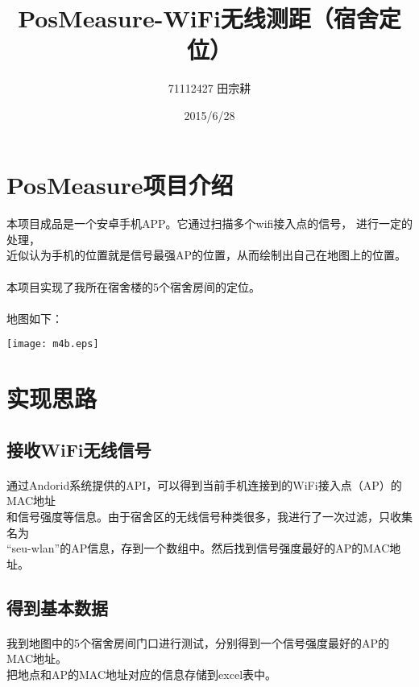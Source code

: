 \documentclass[a4paper,10pt]{article}
\title{PosMeasure-WiFi无线测距（宿舍定位）}
\author{71112427 田宗耕}
\date{2015/6/28}
\begin{document}
\maketitle
  \section{PosMeasure项目介绍}
    \paragraph{} 本项目成品是一个安卓手机APP。它通过扫描多个wifi接入点的信号， 进行一定的处理，\\
    近似认为手机的位置就是信号最强AP的位置，从而绘制出自己在地图上的位置。
    \paragraph{} 本项目实现了我所在宿舍楼的5个宿舍房间的定位。
    \paragraph{} 地图如下：\\
    \begin{center} \texttt{[image: m4b.eps]} \end{center}
  
  \section{实现思路}
    \subsection{接收WiFi无线信号}
    \paragraph{} 通过Andorid系统提供的API，可以得到当前手机连接到的WiFi接入点（AP）的MAC地址\\
    和信号强度等信息。由于宿舍区的无线信号种类很多，我进行了一次过滤，只收集名为\\
    “seu-wlan”的AP信息，存到一个数组中。然后找到信号强度最好的AP的MAC地址。
    \subsection{得到基本数据}
    \paragraph{} 我到地图中的5个宿舍房间门口进行测试，分别得到一个信号强度最好的AP的MAC地址。\\
    把地点和AP的MAC地址对应的信息存储到excel表中。
\end{document}
